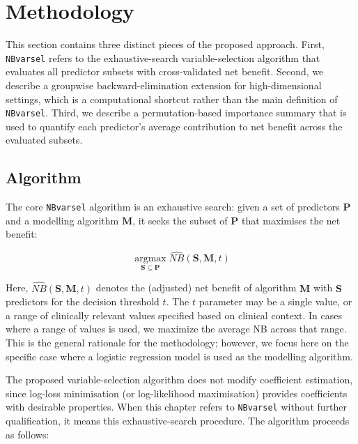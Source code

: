 \section{Methodology}

This section contains three distinct pieces of the proposed approach. First, \texttt{NBvarsel} refers to the exhaustive-search variable-selection algorithm that evaluates all predictor subsets with cross-validated net benefit. Second, we describe a groupwise backward-elimination extension for high-dimensional settings, which is a computational shortcut rather than the main definition of \texttt{NBvarsel}. Third, we describe a permutation-based importance summary that is used to quantify each predictor's average contribution to net benefit across the evaluated subsets.

\subsection{Algorithm}
\label{sec:algorithm}
The core \texttt{NBvarsel} algorithm is an exhaustive search: given a set of predictors $\mathbf{P}$ and a modelling algorithm $\mathbf{M}$, it seeks the subset of $\mathbf{P}$ that maximises the net benefit:

\begin{equation}
\underset{\mathbf{S} \subseteq \mathbf{P}}{\operatorname{argmax}} \widehat{NB}(\mathbf{S}, \mathbf{M}, t)
\end{equation}

Here, $\widehat{NB}(\mathbf{S}, \mathbf{M}, t)$ denotes the (adjusted) net benefit of algorithm $\mathbf{M}$ with $\mathbf{S}$ predictors for the decision threshold $t$. The $t$ parameter may be a single value, or a range of clinically relevant values specified based on clinical context. In cases where a range of values is used, we maximize the average \gls{NB} across that range. This is the general rationale for the methodology; however, we focus here on the specific case where a logistic regression model is used as the modelling algorithm.

The proposed variable-selection algorithm does not modify coefficient estimation, since log-loss minimisation (or log-likelihood maximisation) provides coefficients with desirable properties. When this chapter refers to \texttt{NBvarsel} without further qualification, it means this exhaustive-search procedure. The algorithm proceeds as follows:

